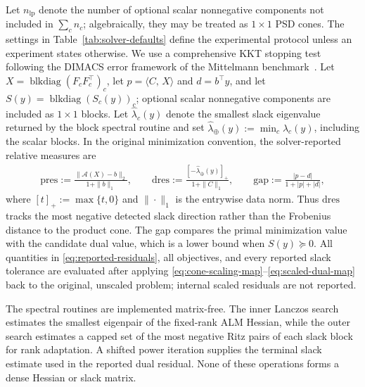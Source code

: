 \documentclass[11pt]{article}
\theoremstyle{definition}
\theoremstyle{remark}
\newcommand{\inner}[2]{\langle #1,\, #2\rangle}
\newcommand{\Aop}{\mathcal{A}}              %
\newcommand{\blkdiag}{\operatorname{blkdiag}}
\begin{document}
Let $n_{\mathrm{lp}}$ denote the number of optional scalar nonnegative
components not included in $\sum_c n_c$; algebraically, they may be
treated as $1\times1$ PSD cones.
The settings in Table~\ref{tab:solver-defaults} define the experimental
protocol unless an experiment states otherwise.  We use a comprehensive KKT
stopping test following the DIMACS error framework of the Mittelmann
benchmark~\cite{Mittelmann}.  Let $X=\blkdiag(F_cF_c^\top)_c$, let
$p=\inner{C}{X}$ and $d=b^\top y$, and let
$S(y)=\blkdiag(S_c(y))_c$; optional scalar nonnegative components are included
as $1\times1$ blocks.  Let $\widehat\lambda_c(y)$ denote the smallest
slack eigenvalue returned by the block spectral routine and set
$\widehat\lambda_\oplus(y):=\min_c\widehat\lambda_c(y)$, including the
scalar blocks.  In the original minimization convention, the solver-reported
relative measures are
\begin{equation}
\begin{aligned}
  \mathrm{pres}
    :=\frac{\|\Aop(X)-b\|_2}{1+\|b\|_1}, \qquad 
  \mathrm{dres}
    :=\frac{[-\widehat\lambda_\oplus(y)]_+}{1+\|C\|_1},\qquad 
  \mathrm{gap}
    :=\frac{|p-d|}{1+|p|+|d|},
\end{aligned}
\label{eq:reported-residuals}
\end{equation}
where $[t]_+:=\max\{t,0\}$ and $\|\cdot\|_1$ is the entrywise data norm.
Thus $\mathrm{dres}$ tracks the most negative detected slack direction rather
than the Frobenius distance to the product cone.  The gap compares the primal
minimization value with the candidate dual value, which is a lower bound when
$S(y)\succeq0$.
All quantities in \eqref{eq:reported-residuals}, all objectives, and every
reported slack tolerance are evaluated after applying
\eqref{eq:cone-scaling-map}--\eqref{eq:scaled-dual-map} back to the original,
unscaled problem; internal scaled residuals are not reported.

The spectral routines are implemented matrix-free.  The inner Lanczos
search estimates the smallest eigenpair of the fixed-rank ALM Hessian, while
the outer search estimates a capped set of the most negative Ritz pairs of
each slack block for rank adaptation.  A shifted power iteration supplies the
terminal slack estimate used in the reported dual residual.  None of these
operations forms a dense Hessian or slack matrix.
\end{document}
